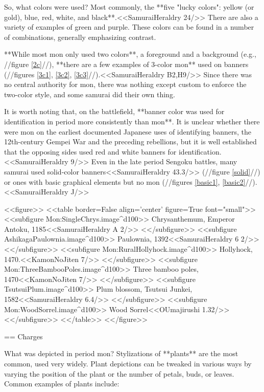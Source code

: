   So, what colors were used?  Most commonly, the **five "lucky
  colors": yellow (or gold), blue, red, white, and
  black**.<<SamuraiHeraldry 24/>> There are also a variety of examples
  of green and purple.  These colors can be found in a number of
  combinations, generally emphasizing contrast.

  **While most mon only used two colors**, a foreground and a background
  (e.g., //figure \ref{2c}//), **there are a few examples of 3-color mon**
  used on banners (//figures \ref{3c1}, \ref{3c2},
  \ref{3c3}//).<<SamuraiHeraldry B2,H9/>> Since there was no central
  authority for mon, there was nothing except custom to enforce the
  two-color style, and some samurai did their own thing.

  It is worth noting that, on the battlefield, **banner color was used for identification in period more
  consistently than mon**.  It is unclear whether there were mon on the
  earliest documented Japanese uses of identifying banners, the
  12th-century Gempei War and the preceding rebellions, but it is well
  established that the opposing sides used red and white banners for
  identification.<<SamuraiHeraldry 9/>> Even in the late period
  Sengoku battles, many samurai used solid-color
  banners<<SamuraiHeraldry 43.3/>> (//figure \ref{solid}//) or ones with basic graphical
  elements but no mon (//figures \ref{basic1}, \ref{basic2}//).<<SamuraiHeraldry J/>>

  <<figure>>
  <<table border=False align='center' figure=True font="small">>
  <<subfigure Mon:SingleChrys.image^d100>>
    \label{chrys}Chrysanthemum, Emperor Antoku, 1185<<SamuraiHeraldry A 2/>>
  <</subfigure>>
  <<subfigure AshikagaPaulownia.image^d100>>
    \label{paul}Paulownia, 1392<<SamuraiHeraldry 6 2/>>
  <</subfigure>>
  <<subfigure Mon:RuralHollyhock.image^d100>>
    \label{hollyhock}Hollyhock, 1470.<<KamonNoJiten 7/>>
  <</subfigure>>
  <<subfigure Mon:ThreeBambooPoles.image^d100>>
    \label{bamboo}Three bamboo poles, 1470<<KamonNoJiten 7/>>
  <</subfigure>>
  <<subfigure TsutsuiPlum.image^d100>>
    \label{plum} Plum blossom, Tsutsui Junkei, 1582<<SamuraiHeraldry 6.4/>>
  <</subfigure>>
  <<subfigure Mon:WoodSorrel.image^d100>>
    \label{sorrel} Wood Sorrel<<OUmajirushi 1.32/>>
  <</subfigure>>
  <</table>>
  <</figure>>

  == Charges

  What was depicted in period mon?  Stylizations of **plants** are the
  most common, used very widely.  Plant depictions can be tweaked in
  various ways by varying the position of the plant or the number of
  petals, buds, or leaves.  Common examples of plants include:

